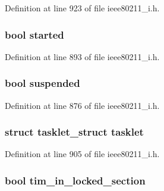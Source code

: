 Definition at line 923 of file ieee80211\-\_\-i.\-h.

\hypertarget{structieee80211__local_a43c08d193d555a2b2a61c53d2a4e5a63}{
\subsubsection[{started}]{\setlength{\rightskip}{0pt plus 5cm}bool started}}\label{structieee80211__local_a43c08d193d555a2b2a61c53d2a4e5a63}


Definition at line 893 of file ieee80211\-\_\-i.\-h.

\hypertarget{structieee80211__local_ae0ed5063d998fba626c0783a36391f3c}{
\subsubsection[{suspended}]{\setlength{\rightskip}{0pt plus 5cm}bool suspended}}\label{structieee80211__local_ae0ed5063d998fba626c0783a36391f3c}


Definition at line 876 of file ieee80211\-\_\-i.\-h.

\hypertarget{structieee80211__local_a4308a8fe6dfe7c223959f8b219a05695}{
\subsubsection[{tasklet}]{\setlength{\rightskip}{0pt plus 5cm}struct tasklet\-\_\-struct tasklet}}\label{structieee80211__local_a4308a8fe6dfe7c223959f8b219a05695}


Definition at line 905 of file ieee80211\-\_\-i.\-h.

\hypertarget{structieee80211__local_a34d7d9b6d74715302c953d01980bdebf}{
\subsubsection[{tim\-\_\-in\-\_\-locked\-\_\-section}]{\setlength{\rightskip}{0pt plus 5cm}bool tim\-\_\-in\-\_\-locked\-\_\-section}}\label{structieee80211__local_a34d7d9b6d74715302c953d01980bdebf}


